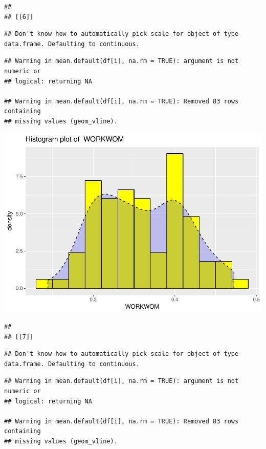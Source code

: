 \documentclass[]{article}
\begin{document}
\begin{verbatim}
## 
## [[6]]
\end{verbatim}

\begin{verbatim}
## Don't know how to automatically pick scale for object of type data.frame. Defaulting to continuous.
\end{verbatim}

\begin{verbatim}
## Warning in mean.default(df[i], na.rm = TRUE): argument is not numeric or
## logical: returning NA

## Warning in mean.default(df[i], na.rm = TRUE): Removed 83 rows containing
## missing values (geom_vline).
\end{verbatim}

\includegraphics{Desc_stats_files/figure-latex/unnamed-chunk-2-6.pdf}

\begin{verbatim}
## 
## [[7]]
\end{verbatim}

\begin{verbatim}
## Don't know how to automatically pick scale for object of type data.frame. Defaulting to continuous.
\end{verbatim}

\begin{verbatim}
## Warning in mean.default(df[i], na.rm = TRUE): argument is not numeric or
## logical: returning NA

## Warning in mean.default(df[i], na.rm = TRUE): Removed 83 rows containing
## missing values (geom_vline).
\end{verbatim}
\end{document}
